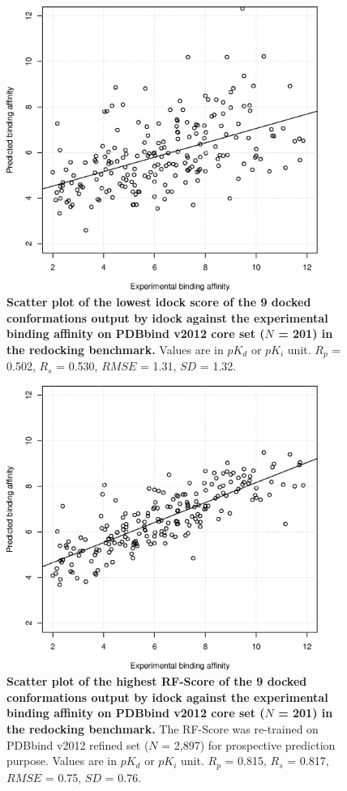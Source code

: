 \documentclass[10pt]{article}
\begin{document}
\begin{figure}[!ht]
\begin{center}
\includegraphics[width=4in]{../istar/pK-idockConf1idock.eps}
\end{center}
\caption{
{\bf Scatter plot of the lowest idock score of the 9 docked conformations output by idock against the experimental binding affinity on PDBbind v2012 core set ($N$ = 201) in the redocking benchmark.} Values are in $pK_d$ or $pK_i$ unit. $R_p$ = 0.502, $R_s$ = 0.530, $RMSE$ = 1.31, $SD$ = 1.32.
}
\label{pK-idockConf1idock}
\end{figure}

\begin{figure}[!ht]
\begin{center}
\includegraphics[width=4in]{../istar/pK-idockConfsRFScoreMax.eps}
\end{center}
\caption{
{\bf Scatter plot of the highest RF-Score of the 9 docked conformations output by idock against the experimental binding affinity on PDBbind v2012 core set ($N$ = 201) in the redocking benchmark.} The RF-Score was re-trained on PDBbind v2012 refined set ($N$ = 2,897) for prospective prediction purpose. Values are in $pK_d$ or $pK_i$ unit. $R_p$ = 0.815, $R_s$ = 0.817, $RMSE$ = 0.75, $SD$ = 0.76.
}
\label{pK-idockConfsRFScoreMax}
\end{figure}
\end{document}
